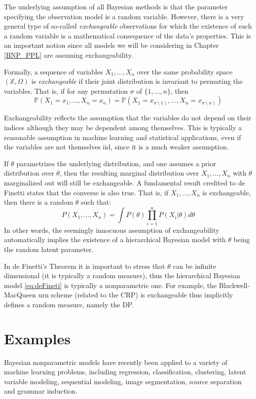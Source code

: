 The underlying assumption of all Bayesian methods is that the parameter specifying the observation model is a random variable. 
However, there is a very general type of so-called \textit{exchangeable} observations for which the existence of such a random variable is a mathematical consequence of the data's properties. This is an important notion since all models we will be considering in Chapter \ref{BNP_PPL} are assuming exchangeability.

Formally, a sequence of variables $X_1,\dots,X_n$ over the same probability space $(\mathbb{X},\Omega)$ is \textit{exchangeable} if their joint distribution is invariant to permuting the variables. That is, if for any permutation $\sigma$ of $\{1,\dots,n\}$, then
$$ \mathbb{P}(X_1=x_1,\dots,X_n=x_n) = \mathbb{P}(X_1=x_{\sigma(1)},\dots,X_n=x_{\sigma(n)}) $$

Exchangeability reflects the assumption that the variables do not depend on their indices although they may be dependent among themselves. This is typically a reasonable assumption in machine learning and statistical applications, even if the variables are not themselves iid, since it is a much weaker assumption.

If $\theta$ parametrizes the underlying distribution, and one assumes a prior distribution over $\theta$, then the resulting marginal distribution over $X_1,\dots,X_n$ with $\theta$ marginalized out will still be exchangeable. A fundamental result credited to de Finetti \cite{finetti31} states that the converse is also true. That is, if $X_1,\dots,X_n$ is exchangeable, then there is a random $\theta$ such that:
\begin{equation} \label{eq:deFineti}
P(X_1,\dots,X_n) = \int{P(\theta)\prod_{i=1}^n{P(X_i|\theta) d\theta}}
\end{equation}
In other words, the seemingly innocuous assumption of exchangeability automatically implies the existence of a hierarchical Bayesian model with $\theta$ being the random latent parameter.

In de Finetti’s Theorem it is important to stress that $\theta$ can be infinite dimensional (it is typically a random measure), thus the hierarchical Bayesian model \ref{eq:deFineti} is typically a nonparametric one. For example, the Blackwell-MacQueen urn scheme (related to the \gls{CRP}) is exchangeable thus implicitly defines a random measure, namely the \gls{DP}.


\section{Examples}
Bayesian nonparametric models have recently been applied to a variety of machine learning problems, including regression, classification, clustering, latent variable modeling, sequential modeling, image segmentation, source separation and grammar induction.


